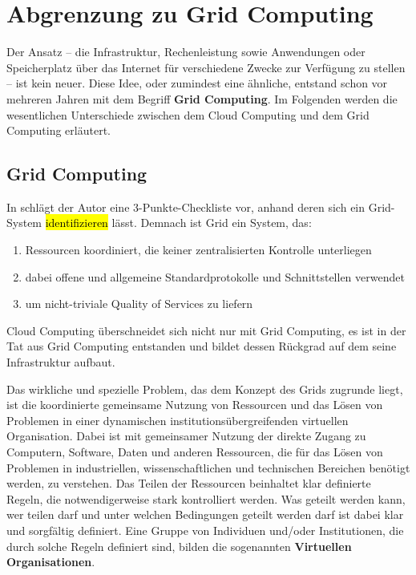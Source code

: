 \section{Abgrenzung zu Grid Computing}
Der Ansatz -- die Infrastruktur, Rechenleistung sowie Anwendungen oder Speicherplatz über das Internet für verschiedene Zwecke zur Verfügung zu stellen -- ist kein neuer.
Diese Idee, oder zumindest eine ähnliche, entstand schon vor mehreren Jahren mit dem Begriff \textbf{Grid Computing}.
Im Folgenden werden die wesentlichen Unterschiede zwischen dem Cloud Computing und dem Grid Computing erläutert.
 
\subsection{Grid Computing}
In \cite{grid-checklist} schlägt der Autor eine 3-Punkte-Checkliste vor, anhand deren sich ein Grid-System \hl{identifizieren} lässt. Demnach ist Grid ein System, das:
\begin{enumerate}
  \item Ressourcen koordiniert, die keiner zentralisierten Kontrolle unterliegen
  \item dabei offene und allgemeine Standardprotokolle und Schnittstellen verwendet
  \item um nicht-triviale \glqq Quality of Services\grqq{} zu liefern
\end{enumerate}

Cloud Computing überschneidet sich nicht nur mit Grid Computing, es ist in der Tat aus Grid Computing entstanden und bildet dessen Rückgrad auf dem seine Infrastruktur aufbaut\cite{360-degree-compared}.

Das wirkliche und spezielle Problem, das dem Konzept des Grids zugrunde liegt,
ist die koordinierte gemeinsame Nutzung von Ressourcen und das Lösen von Problemen
in einer dynamischen institutionsübergreifenden virtuellen Organisation.
Dabei ist mit \glqq gemeinsamer Nutzung\grqq{} der direkte Zugang zu Computern, Software, Daten und anderen Ressourcen,
die für das Lösen von Problemen in industriellen, wissenschaftlichen und technischen Bereichen benötigt werden, zu verstehen.
Das Teilen der Ressourcen beinhaltet klar definierte Regeln, die notwendigerweise stark kontrolliert werden.
Was geteilt werden kann, wer teilen darf und unter welchen Bedingungen geteilt werden darf ist dabei klar und sorgfältig definiert.
Eine Gruppe von Individuen und/oder Institutionen, die durch solche Regeln definiert sind,
bilden die sogenannten \textbf{Virtuellen Organisationen}.\cite{anatomy-of-grid}

